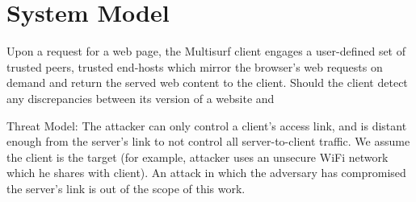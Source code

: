 \section{System Model}
\label{sec:model}

Upon a request for a web page, the Multisurf client engages a user-defined set of trusted peers, trusted end-hosts which mirror the browser's web requests on demand and return the served web content to the client.
Should the client detect any discrepancies between its version of a website and 

Threat Model:
The attacker can only control a client’s access link, and is distant enough from the server’s link to not control all server-to-client traffic. We assume the client is the target (for example, attacker uses an unsecure WiFi network which he shares with client).
An attack in which the adversary has compromised the server’s link is out of the scope of this work.